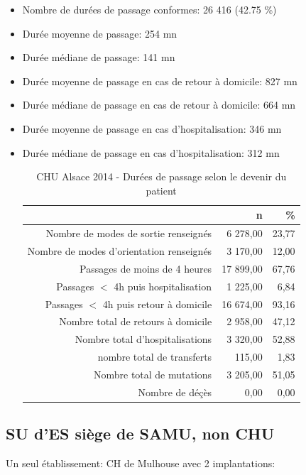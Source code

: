 \documentclass[]{article}
\begin{document}
\begin{itemize}
\itemsep1pt\parskip0pt
\item
  Nombre de durées de passage conformes: 26 416 (42.75 \%)
\item
  Durée moyenne de passage: 254 mn
\item
  Durée médiane de passage: 141 mn
\item
  Durée moyenne de passage en cas de retour à domicile: 827 mn
\item
  Durée médiane de passage en cas de retour à domicile: 664 mn
\item
  Durée moyenne de passage en cas d'hospitalisation: 346 mn
\item
  Durée médiane de passage en cas d'hospitalisation: 312 mn

  \begin{table}[ht]
  \centering
  \begin{tabular}{rrr}
    \hline
   & n & \% \\ 
    \hline
  Nombre de modes de sortie renseignés & 6 278,00 & 23,77 \\ 
    Nombre de modes d'orientation renseignés & 3 170,00 & 12,00 \\ 
    Passages de moins de 4 heures & 17 899,00 & 67,76 \\ 
    Passages $<$ 4h puis hospitalisation & 1 225,00 & 6,84 \\ 
    Passages $<$ 4h puis retour à domicile & 16 674,00 & 93,16 \\ 
    Nombre total de retours à domicile & 2 958,00 & 47,12 \\ 
    Nombre total d'hospitalisations & 3 320,00 & 52,88 \\ 
    nombre total de transferts & 115,00 & 1,83 \\ 
    Nombre total de mutations & 3 205,00 & 51,05 \\ 
    Nombre de déçès & 0,00 & 0,00 \\ 
     \hline
  \end{tabular}
  \caption{CHU Alsace 2014 - Durées de passage selon le devenir du patient} 
  \end{table}
\end{itemize}

\subsection{SU d'ES siège de SAMU, non
CHU}\label{su-des-siege-de-samu-non-chu}

Un seul établissement: CH de Mulhouse avec 2 implantations:
\end{document}
